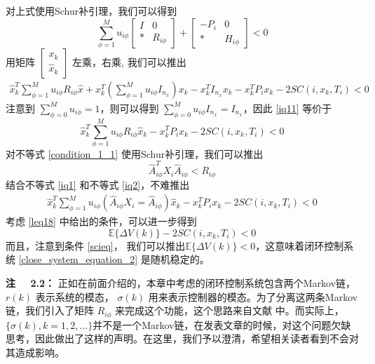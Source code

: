 	对上式使用Schur补引理，我们可以得到
	\begin{equation} \label{cons}
	\sum_{\phi=1}^{M}u_{i\phi} \begin{bmatrix}
	I&0\\
	*&R_{i\phi}
	\end{bmatrix} + \begin{bmatrix}
	-P_{i }&0\\
	*&H_{i\phi}
	\end{bmatrix} <0
	\end{equation}
	用矩阵 $\begin{bmatrix}
	x_k\\
	\hat{x}_{k}
	\end{bmatrix}$ 左乘，右乘, 我们可以推出
	\begin{equation} \label{iq11}
	\begin{split}
	\hat{x}^{T}_{k}\sum_{\phi=1}^{M}u_{i\phi}R_{i\phi}\hat{x}+x^{T}_{k}(\sum_{\phi=1}^{M}u_{i\phi}I_{n_x})x_{k}-x^{T}_{k}I_{n_x}x_{k} -x^{T}_{k}P_{i}x_{k}-2SC(i,x_k,T_i)<0
	\end{split}
	\end{equation}
	注意到 $\sum_{\phi=0}^{M}u_{i\phi}=1$，则可以得到 $\sum_{\phi=0}^{M}u_{i\phi}I_{n_x}=I_{n_x}$，因此 \eqref{iq11} 等价于
	\begin{equation} \label{iq1}
	\hat{x}^{T}_{k}\sum_{\phi=1}^{M}u_{i\phi}R_{i\phi}\hat{x}_k-x^{T}_{k}P_{i}x_{k}-2SC(i,x_k,T_i)<0
	\end{equation}
	对不等式 \eqref{condition_1_1} 使用Schur补引理，我们可以推出
	\begin{equation} \label{iq2}
	\hat{A}^{T}_{i\phi}X_{i}\hat{A}_{i\phi}<R_{i\phi}
	\end{equation}
	结合不等式 \eqref{iq1} 和不等式 \eqref{iq2}，不难推出
	\begin{equation} \label{leq22}
	\begin{split}
	\hat{x}^{T}_{k}\sum_{\phi=1}^{M} u_{i\phi}(\hat{A}_{i\phi}X_{i}=\hat{A}_{i\phi}) \hat{x}_{k} - x^{T}_{k}P_{i}x_{k} -2SC(i,x_k,T_i)<0
	\end{split}
	\end{equation}
	考虑 \eqref{leq18} 中给出的条件，可以进一步得到
	\begin{equation}
	\mathbb{E}\{\varDelta V(k)\}-2SC(i,x_k,T_i)<0
	\end{equation}
	而且，注意到条件 \eqref{scieq}， 我们可以推出$\mathbb{E}\{\varDelta V(k)\} <0$，这意味着闭环控制系统  \eqref{close_system_equation_2} 是随机稳定的。
	
	{\bf 注 \ \ 2.2：} 
	正如在前面介绍的，本章中考虑的闭环控制系统包含两个Markov链，$r(k)$ 表示系统的模态， $\sigma(k)$ 用来表示控制器的模态。为了分离这两条Markov链，我们引入了矩阵 $R_{i\phi}$ 来完成这个功能，这个思路来自文献 \cite{wu2016passivity}中。而实际上， $\{\sigma(k), k=1,2,\dots\}$并不是一个Markov链，在发表文章的时候，对这个问题欠缺思考，因此做出了这样的声明。在这里，我们予以澄清，希望相关读者看到不会对其造成影响。 
	
